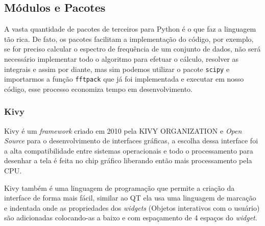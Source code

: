            \begin{quote}
                                                        
            \end{quote}
            
        \subsection{Módulos e Pacotes}
            
            A vasta quantidade de pacotes de terceiros para Python é o que faz a linguagem tão rica.
            De fato, os 
            pacotes facilitam a implementação do código, por exemplo, se for preciso calcular o espectro de 
            frequência de um conjunto de dados, não será necessário implementar todo o algoritmo para efetuar o cálculo, resolver as integrais e assim por diante, mas sim podemos utilizar o pacote \verb|scipy| e importarmos a função \verb|fftpack| que já foi implementada e executar em nosso código, esse processo economiza tempo em desenvolvimento.           
            
            \subsubsection{Kivy}
            
            
            \label{lim_kivy}
            Kivy é um \textit{framework} criado em 2010 pela KIVY ORGANIZATION \cite{kivy} e \textit{Open Source} para o desenvolvimento de interfaces gráficas, a escolha dessa interface foi a alta compatibilidade entre sistemas operacionais e todo o processamento para desenhar a tela é feita no chip gráfico liberando então mais processamento pela CPU.
            
            Kivy também é uma linguagem de programação que permite a criação da interface de forma mais fácil, similar ao QT \cite{qt} ela usa uma linguagem de marcação e indentada onde as propriedades dos \textit{widgets} (Objetos interativos com o usuário) são adicionadas colocando-as a baixo e com espaçamento de 4 espaços do \textit{widget}. 
                        
